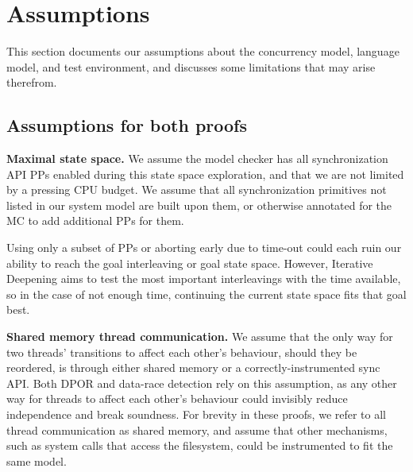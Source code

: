 \section{Assumptions}

This section documents our assumptions about the concurrency model, language model, and test environment,
and discusses some limitations that may arise therefrom.

\subsection{Assumptions for both proofs}

{\bf Maximal state space.}
We assume the model checker has all
synchronization API
PPs enabled during this state space exploration,
and that we are not limited by a pressing CPU budget.
We assume that all synchronization primitives not listed in our system model are built upon them,
or otherwise annotated for the MC to add additional PPs for them.

Using only a subset of PPs or aborting early due to time-out could each ruin our ability to reach the goal interleaving or goal state space.
However, Iterative Deepening aims to test the most important interleavings with the time available,
so in the case of not enough time,
continuing the current state space fits that goal best.


{\bf Shared memory thread communication.}
We assume that the only way for two threads' transitions to affect each other's behaviour, should they be reordered,
is through either shared memory or a correctly-instrumented sync API.
Both DPOR and data-race detection rely on this assumption,
as any other way for threads to affect each other's behaviour could invisibly reduce independence and break soundness.
For brevity in these proofs, we refer to all thread communication as shared memory,
and assume that other mechanisms, such as system calls that access the filesystem, could be instrumented to fit the same model.


